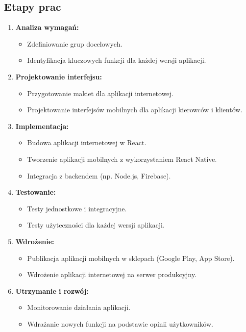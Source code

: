 \subsection{Etapy prac}
\begin{enumerate}
    \item \textbf{Analiza wymagań:}
    \begin{itemize}
        \item Zdefiniowanie grup docelowych.
        \item Identyfikacja kluczowych funkcji dla każdej wersji aplikacji.
    \end{itemize}
    \item \textbf{Projektowanie interfejsu:}
    \begin{itemize}
        \item Przygotowanie makiet dla aplikacji internetowej.
        \item Projektowanie interfejsów mobilnych dla aplikacji kierowców i klientów.
    \end{itemize}
    \item \textbf{Implementacja:}
    \begin{itemize}
        \item Budowa aplikacji internetowej w React.
        \item Tworzenie aplikacji mobilnych z wykorzystaniem React Native.
        \item Integracja z backendem (np. Node.js, Firebase).
    \end{itemize}
    \item \textbf{Testowanie:}
    \begin{itemize}
        \item Testy jednostkowe i integracyjne.
        \item Testy użyteczności dla każdej wersji aplikacji.
    \end{itemize}
    \item \textbf{Wdrożenie:}
    \begin{itemize}
        \item Publikacja aplikacji mobilnych w sklepach (Google Play, App Store).
        \item Wdrożenie aplikacji internetowej na serwer produkcyjny.
    \end{itemize}
    \item \textbf{Utrzymanie i rozwój:}
    \begin{itemize}
        \item Monitorowanie działania aplikacji.
        \item Wdrażanie nowych funkcji na podstawie opinii użytkowników.
    \end{itemize}
\end{enumerate}

